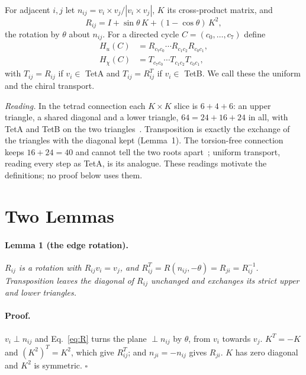 \documentclass[twocolumn]{iopjournal}
\begin{document}
For adjacent $i, j$ let $n_{ij} = v_i\times v_j/|v_i\times v_j|$, $K$
its cross-product matrix, and
\begin{equation}
  R_{ij} = I + \sin\theta\,K + (1 - \cos\theta)\,K^2 ,
  \label{eq:R}
\end{equation}
the rotation by $\theta$ about $n_{ij}$. For a directed cycle
$C = (c_0, \dots, c_7)$ define
\begin{equation}
\begin{aligned}
  H_u(C) &= R_{c_7c_0}\cdots R_{c_1c_2}R_{c_0c_1},\\
  H_\chi(C) &= T_{c_7c_0}\cdots T_{c_1c_2}T_{c_0c_1},
\end{aligned}
  \label{eq:H}
\end{equation}
with $T_{ij} = R_{ij}$ if $v_i \in$ TetA and $T_{ij} = R_{ij}^T$ if
$v_i \in$ TetB. We call these the uniform and the chiral transport.

\medskip
\noindent
\textit{Reading.} In the tetrad connection each $K\times K$ slice is
$6 + 4 + 6$: an upper triangle, a shared diagonal and a lower triangle,
$64 = 24 + 16 + 24$ in all, with TetA and TetB on the two
triangles~\cite{Gram}. Transposition is exactly the exchange of the
triangles with the diagonal kept (Lemma~1). The torsion-free
connection keeps $16 + 24 = 40$ and cannot tell the two roots
apart~\cite{L2}; uniform transport, reading every step as TetA, is its
analogue. These readings motivate the definitions; no proof below
uses them.


\section*{Two Lemmas}

\paragraph{Lemma 1 (the edge rotation).} \textit{$R_{ij}$ is a
rotation with $R_{ij}v_i = v_j$, and
$R_{ij}^T = R(n_{ij}, -\theta) = R_{ji} = R_{ij}^{-1}$. Transposition
leaves the diagonal of $R_{ij}$ unchanged and exchanges its strict
upper and lower triangles.}

\paragraph{Proof.} $v_i\perp n_{ij}$ and Eq.~\eqref{eq:R} turns the
plane $\perp n_{ij}$ by $\theta$, from $v_i$ towards $v_j$.
$K^T = -K$ and $(K^2)^T = K^2$, which give $R_{ij}^T$; and
$n_{ji} = -n_{ij}$ gives $R_{ji}$. $K$ has zero diagonal and
$K^2$ is symmetric. \hfill $\square$
\end{document}

